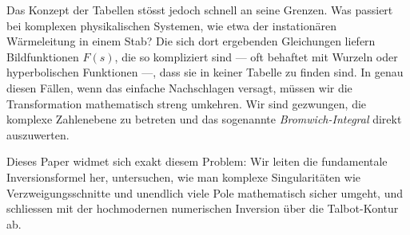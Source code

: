 Das Konzept der Tabellen stösst jedoch schnell an seine Grenzen.
Was passiert bei komplexen physikalischen Systemen, wie etwa der instationären Wärmeleitung in einem Stab?
%
Die sich dort ergebenden Gleichungen liefern Bildfunktionen $F(s)$, die so kompliziert sind --- oft behaftet mit Wurzeln oder hyperbolischen Funktionen ---, dass sie in keiner Tabelle zu finden sind.
In genau diesen Fällen, wenn das einfache Nachschlagen versagt, müssen wir die Transformation mathematisch streng umkehren.
Wir sind gezwungen, die komplexe Zahlenebene zu betreten und das sogenannte \emph{Bromwich-Integral} direkt auszuwerten.
%

Dieses Paper widmet sich exakt diesem Problem:
Wir leiten die fundamentale Inversionsformel her, untersuchen, wie man komplexe Singularitäten wie Verzweigungsschnitte und unendlich viele Pole mathematisch sicher umgeht, und schliessen mit der hochmodernen numerischen Inversion über die Talbot-Kontur ab.
%
%
%
%
